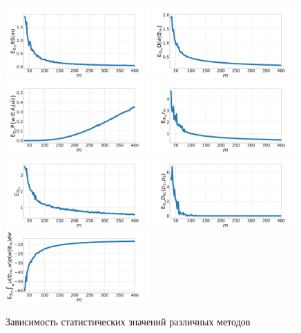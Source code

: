 \begin{figure}[h!t]\center
    \includegraphics[width=0.49\textwidth]{results/samplesize/cross.pdf}
    \includegraphics[width=0.49\textwidth]{results/samplesize/apvc.pdf}\\
    \includegraphics[width=0.49\textwidth]{results/samplesize/acc.pdf}
    \includegraphics[width=0.49\textwidth]{results/samplesize/alc.pdf}\\
    \includegraphics[width=0.49\textwidth]{results/samplesize/bootstrap.pdf}
    \includegraphics[width=0.49\textwidth]{results/samplesize/kl.pdf}\\
    \includegraphics[width=0.49\textwidth]{results/samplesize/maxu.pdf}
    \caption{Зависимость статистических значений различных методов}
    \label{fig1}
\end{figure}

